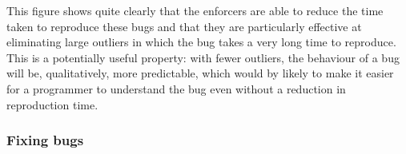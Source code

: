 \begin{sanefig}
  
  \caption{CDF of time taken to reproduce the bugs in the artificial
    test programs, with and without \glspl{bugenforcer}, and some
    summary statistics.  Note log scale.  All times in seconds.  Means
    calculated ignoring timeouts.  Grey region gives a 90\% confidence
    interval, computed using the Dvoretsky-Kiefer-Wolfowitz-Massart
    (DKWM) inequality .  Note that DKWM
    confidence intervals are curve-wise rather than point-wise
    i.e. there is a 90\% confidence that the entire curve is within
    the shaded region, rather than that any given point is.}
\end{sanefig}

This figure shows quite clearly that the enforcers are able to reduce
the time taken to reproduce these bugs and that they are particularly
effective at eliminating large outliers in which the bug takes a very
long time to reproduce.  This is a potentially useful property: with
fewer outliers, the behaviour of a bug will be, qualitatively, more
predictable, which would by likely to make it easier for a programmer
to understand the bug even without a reduction in reproduction time.

\subsubsection{Fixing bugs}

